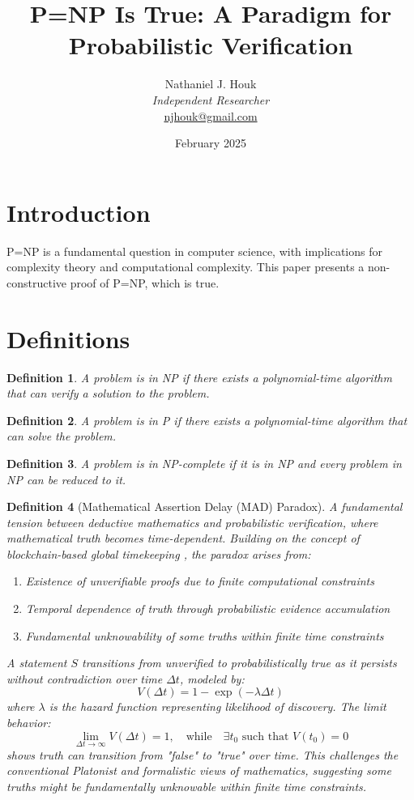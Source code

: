 \documentclass{article}
\title{P=NP Is True: A Paradigm for Probabilistic Verification}
\author{Nathaniel J. Houk\\
\textit{Independent Researcher}\\
\href{mailto:njhouk@gmail.com}{njhouk@gmail.com}}
\date{February 2025}
\newtheorem{definition}{Definition}
\begin{document}
\maketitle
\tableofcontents

\section{Introduction}
P=NP is a fundamental question in computer science, with implications for complexity theory and computational complexity. This paper presents a non-constructive proof of P=NP, which is true.

\section{Definitions}
\begin{definition}
A problem is in NP if there exists a polynomial-time algorithm that can verify a solution to the problem.
\end{definition}

\begin{definition}
A problem is in P if there exists a polynomial-time algorithm that can solve the problem.
\end{definition}

\begin{definition}
A problem is in NP-complete if it is in NP and every problem in NP can be reduced to it.
\end{definition}

\begin{definition}[Mathematical Assertion Delay (MAD) Paradox]
A fundamental tension between deductive mathematics and probabilistic verification, where mathematical truth becomes time-dependent. Building on the concept of blockchain-based global timekeeping \cite{Houk2017Timezones}, the paradox arises from:
\begin{enumerate}
    \item Existence of unverifiable proofs due to finite computational constraints
    \item Temporal dependence of truth through probabilistic evidence accumulation
    \item Fundamental unknowability of some truths within finite time constraints
\end{enumerate}
A statement $S$ transitions from unverified to probabilistically true as it persists without contradiction over time $\Delta t$, modeled by:
\[
V(\Delta t) = 1 - \exp\left(-\lambda \Delta t\right)
\]
where $\lambda$ is the hazard function representing likelihood of discovery. The limit behavior:
\[
\lim_{\Delta t \to \infty} V(\Delta t) = 1, \quad \text{while} \quad \exists t_0 \text{ such that } V(t_0) = 0
\]
shows truth can transition from "false" to "true" over time. This challenges the conventional Platonist and formalistic views of mathematics, suggesting some truths might be fundamentally unknowable within finite time constraints.
\end{definition}
\end{document}
